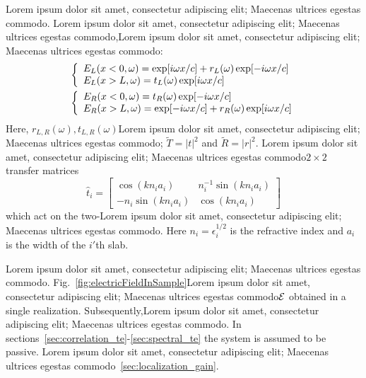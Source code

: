 Lorem ipsum dolor sit amet, consectetur adipiscing elit; Maecenas ultrices egestas commodo. Lorem ipsum dolor sit amet, consectetur adipiscing elit; Maecenas ultrices egestas commodo,Lorem ipsum dolor sit amet, consectetur adipiscing elit; Maecenas ultrices egestas commodo:
\begin{eqnarray}
&\left\{
\begin{array}{l l}
E_L(x<0,\omega)=\exp[i\omega x/c]+r_L(\omega)\exp[-i\omega x/c]\\
E_L(x>L,\omega)=t_L(\omega)\exp[i\omega x/c]\\
\end{array} \right. \label{eq:basis_functions_bc_l}\\
&\left\{
\begin{array}{l l}
E_R(x<0,\omega)=t_R(\omega)\exp[-i\omega x/c]\\
E_R(x>L,\omega)=\exp[-i\omega x/c]+r_R(\omega)\exp[i\omega x/c]\\
\end{array} \right. \label{eq:basis_functions_bc_r}
\end{eqnarray}
Here, $r_{L,R}(\omega),t_{L,R}(\omega)$Lorem ipsum dolor sit amet, consectetur adipiscing elit; Maecenas ultrices egestas commodo; $\tilde{T}=\left|t\right|^2$ and $\tilde{R}=\left|r\right|^2$. Lorem ipsum dolor sit amet, consectetur adipiscing elit; Maecenas ultrices egestas commodo$2\times 2$ transfer matrices\cite{1994_Pendry,2005_Yeh_book,2004_Mello_Kumar_book} 
\begin{equation}
\widehat{t}_i=\left[
\begin{array}{cc}
\cos(k n_i a_i) & n_i^{-1}\sin(k n_i a_i) \\
-n_i \sin(k n_i a_i) & \cos(k n_i a_i)
\end{array}
\right]
\label{eq:transfer_matrix}
\end{equation}
which act on the two-Lorem ipsum dolor sit amet, consectetur adipiscing elit; Maecenas ultrices egestas commodo. Here $n_i=\epsilon_i^{1/2}$ is the refractive index and $a_i$ is the width of the $i'$th slab.

Lorem ipsum dolor sit amet, consectetur adipiscing elit; Maecenas ultrices egestas commodo. Fig.~\ref{fig:electricFieldInSample}Lorem ipsum dolor sit amet, consectetur adipiscing elit; Maecenas ultrices egestas commodo${\cal E}$ obtained in a single realization. Subsequently,Lorem ipsum dolor sit amet, consectetur adipiscing elit; Maecenas ultrices egestas commodo. In sections~\ref{sec:correlation_te}-\ref{sec:spectral_te} the system is assumed to be passive. Lorem ipsum dolor sit amet, consectetur adipiscing elit; Maecenas ultrices egestas commodo~\ref{sec:localization_gain}.

